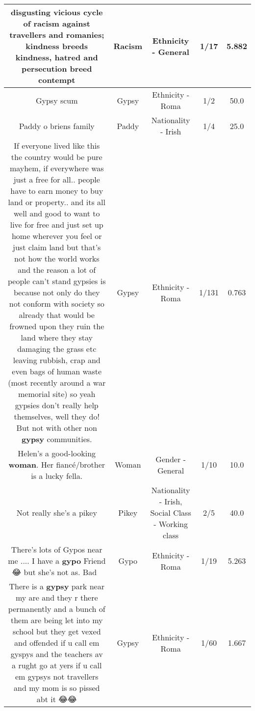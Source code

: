 \documentclass[11pt]{article}
\newlength\mylength
\begin{document}
\begin{center}
\begin{longtable}{|C{.65\mylength}|C{.30\mylength}|C{.12\mylength}|C{.12\mylength}|C{.12\mylength}|}
  \small disgusting vicious cycle of \textbf{racism} against travellers and romanies; kindness breeds kindness, hatred and persecution breed contempt\normalsize   & Racism & Ethnicity - General & 1/17 & 5.882 \\  \hline
  \small Gypsy scum\normalsize   & Gypsy & Ethnicity - Roma & 1/2 & 50.0 \\  \hline
  \small Paddy o briens family\normalsize   & Paddy & Nationality - Irish & 1/4 & 25.0 \\  \hline
  \small If everyone lived like this the country would be pure mayhem, if everywhere was just a free for all.. people have to earn money to buy land or property.. and its all well and good to want to live for free and just set up home wherever you feel or just claim land but that's not how the world works and the reason a lot of people can't stand gypsies is because not only do they not conform with society so already that would be frowned upon they ruin the land where they stay damaging the grass etc leaving rubbish, crap and even bags of human waste (most recently around a war memorial site) so yeah gypsies don't really help themselves, well they do! But not with other non \textbf{gypsy} communities.\normalsize   & Gypsy & Ethnicity - Roma & 1/131 & 0.763 \\  \hline
  \small Helen's a good-looking \textbf{woman}. Her fiancé/brother is a lucky fella.\normalsize   & Woman & Gender - General & 1/10 & 10.0 \\  \hline
  \small Not really she's a pikey\normalsize   & Pikey & Nationality - Irish, Social Class - Working class & 2/5 & 40.0 \\  \hline
  \small There's lots of  Gypos near me .... I have a \textbf{gypo} Friend 😂 but she's not as. Bad 🤣\normalsize   & Gypo & Ethnicity - Roma & 1/19 & 5.263 \\  \hline
  \small There is a \textbf{gypsy} park near my are and they r there permanently and a bunch of them are being let into my school but they get vexed and offended if u call em gyspys and the teachers av a rught go at yers if u call em gypsys not travellers and my mom is so pissed abt it 😂😂\normalsize   & Gypsy & Ethnicity - Roma & 1/60 & 1.667 \\  \hline

\end{longtable}
\end{center}
\end{document}
